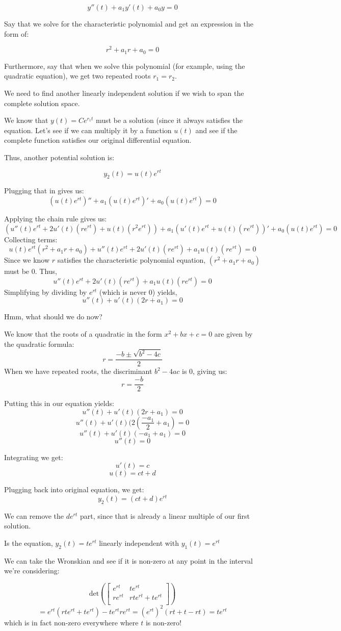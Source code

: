 \documentclass{report}
\begin{document}
$$y''(t) + a_1y'(t) + a_0y = 0$$

Say that we solve for the characteristic polynomial and get an expression in the form of:

$$r^2 + a_1r + a_0 = 0$$

Furthermore, say that when we solve this polynomial (for example, using the quadratic equation), we get two repeated roots $r_1=r_2$.

We need to find another linearly independent solution if we wish to span the complete solution space.

We know that $y(t) = Ce^{r_1t}$ must be a solution (since it always satisfies the equation. Let's see if we can multiply it by a function $u(t)$ and see if the complete function satisfies our original differential equation.

Thus, another potential solution is:

$$y_2(t) = u(t)e^{rt}$$

Plugging that in gives us:
$$(u(t)e^{rt})'' + a_1(u(t)e^{rt})' + a_0(u(t)e^{rt}) = 0$$

Applying the chain rule gives us:
$$(u''(t)e^{rt}+2u'(t)(re^{rt}) + u(t)(r^2e^{rt})) + a_1(u'(t)e^{rt} + u(t)(re^{rt}))' + a_0(u(t)e^{rt}) = 0$$
Collecting terms:
$$u(t)e^{rt}(r^2+a_1r+a_0) +u''(t)e^{rt} + 2u'(t)(re^{rt}) + a_1 u(t)(re^{rt}) = 0$$
Since we know $r$ satisfies the characteristic polynomial equation, $(r^2+a_1r+a_0)$ must be 0. Thus,
$$u''(t)e^{rt} + 2u'(t)(re^{rt}) + a_1 u(t)(re^{rt}) = 0$$
Simplifying by dividing by $e^{rt}$ (which is never 0) yields,
$$u''(t) + u'(t)(2r+a_1) = 0$$

Hmm, what should we do now?

We know that the roots of a quadratic in the form $x^2 + bx + c = 0$ are given by the quadratic formula:
$$r = \frac{-b \pm \sqrt{b^2-4c}}{2}$$
When we have repeated roots, the discriminant $b^2-4ac$ is 0, giving us:
$$r = \frac{-b}{2}$$


Putting this in our equation yields:
$$u''(t)+u'(t)(2r+a_1) = 0$$
$$u''(t)+u'(t)(2(\frac{-a_1}{2}+a_1) = 0$$
$$u''(t) + u'(t)(-a_1+a_1) = 0$$
$$u''(t) = 0$$

Integrating we get:
$$u'(t) = c$$
$$u(t) = ct + d$$

Plugging back into original equation, we get:
$$y_2(t) = (ct+d)e^{rt}$$

We can remove the $de^{rt}$ part, since that is already a linear multiple of our first solution.

Is the equation, $y_2(t) = te^{rt}$ linearly independent with $y_1(t) = e^{rt}$

We can take the Wronskian and see if it is non-zero at any point in the interval we're considering:


$$
    \text{det}\left(\begin{bmatrix}
        e^{rt} & te^{rt}\\
        re^{rt} & rte^{rt}+ te^{rt} \\
    \end{bmatrix}\right)
$$
$$
    = e^{rt}(rte^{rt}+te^{rt}) - te^{rt}re^{rt}
    = (e^{rt})^2(rt+t-rt)
    = te^{rt}
$$
which is in fact non-zero everywhere where $t$ is non-zero!
\end{document}
